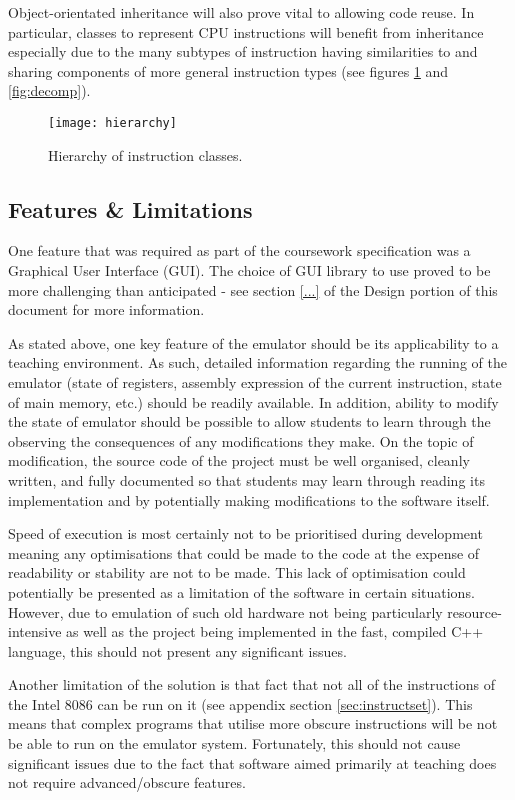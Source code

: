         Object-orientated inheritance will also prove vital to allowing code reuse. In particular, classes to represent CPU instructions will benefit from inheritance especially due to the many subtypes of instruction having similarities to and sharing components of more general instruction types (see figures \ref{fig:hierarchy} and \ref{fig:decomp}).

        \begin{figure}[h]
            \centering
            \texttt{[image: hierarchy]}
            \caption{Hierarchy of instruction classes.}
            \label{fig:hierarchy}
        \end{figure}

\subsection{Features \& Limitations}
    One feature that was required as part of the coursework specification was a Graphical User Interface (GUI). The choice of GUI library to use proved to be more challenging than anticipated - see section \ref{...} of the Design portion of this document for more information.

    As stated above, one key feature of the emulator should be its applicability to a teaching environment. As such, detailed information regarding the running of the emulator (state of registers, assembly expression of the current instruction, state of main memory, etc.) should be readily available. In addition, ability to modify the state of emulator should be possible to allow students to learn through the observing the consequences of any modifications they make. On the topic of modification, the source code of the project must be well organised, cleanly written, and fully documented so that students may learn through reading its implementation and by potentially making modifications to the software itself.

    Speed of execution is most certainly not to be prioritised during development meaning any optimisations that could be made to the code at the expense of readability or stability are not to be made. This lack of optimisation could potentially be presented as a limitation of the software in certain situations. However, due to emulation of such old hardware not being particularly resource-intensive as well as the project being implemented in the fast, compiled C++ language, this should not present any significant issues.

    Another limitation of the solution is that fact that not all of the instructions of the Intel 8086 can be run on it (see appendix section \ref{sec:instructset}). This means that complex programs that utilise more obscure instructions will be not be able to run on the emulator system. Fortunately, this should not cause significant issues due to the fact that software aimed primarily at teaching does not require advanced/obscure features.

